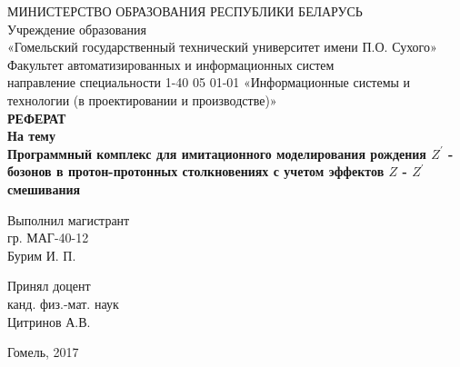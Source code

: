 \begin{titlepage}
	\large
	\begin{center}
		\vspace{3mm}
		МИНИСТЕРСТВО ОБРАЗОВАНИЯ РЕСПУБЛИКИ БЕЛАРУСЬ\\
		Учреждение образования\\
		«Гомельский государственный технический университет имени П.О. Сухого»\\
		Факультет автоматизированных и информационных систем\\
		направление специальности 1-40 05 01-01 «Информационные системы 
		и технологии (в проектировании и производстве)»\\
		\vspace{5mm}
		\textbf{РЕФЕРАТ\\}
		\vspace{5mm} \textbf{ На тему\\
			Программный комплекс для имитационного моделирования рождения $Z^\prime$ - бозонов в протон-протонных столкновениях с учетом эффектов $Z$ - $Z^\prime$ смешивания
		}
	\end{center}
	\vspace{30mm}
	\begin{flushleft}
		\hspace{8cm} Выполнил магистрант\\
		\hspace{8cm} гр. МАГ-40-12\\
		\hspace{8cm} Бурим И. П.\\
	\end{flushleft}
	\begin{flushleft}
		\hspace{8cm} Принял доцент\\
		\hspace{8cm} канд. физ.-мат. наук\\
		\hspace{8cm} Цитринов А.В.\\
	\end{flushleft}
	\begin{center}
		\vfill
		Гомель, 2017
	\end{center}
\end{titlepage}
